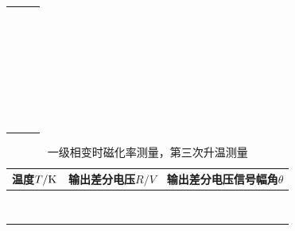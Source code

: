 \documentclass[11pt,a4paper]{ctexart}
\begin{document}
\begin{enumerate}
\begin{table}[H]
\begin{tabular}{|p{32mm}|p{32mm}|p{32mm}|}
  & & \\ \hline
  & & \\ \hline
   & & \\ \hline
    & & \\ \hline
 & & \\ \hline
  &  &\\ \hline
  &  &\\ \hline
  &  &\\ \hline
  &  &\\ \hline
  &  &\\ \hline
  &  &\\ \hline
  &  &\\ \hline
  &  &\\ \hline
  &  &\\ \hline
  &  &\\ \hline
  &  &\\ \hline
  &  &\\ \hline
    & &\\ \hline
  & &\\ \hline
   & &\\ \hline
     &  &\\ \hline
  &  &\\ \hline
  &  &\\ \hline
  &  &\\ \hline
  &  &\\ \hline
  &  &\\ \hline
  &  &\\ \hline
  &  &\\ \hline
    & &\\ \hline
  & &\\ \hline
   & &\\ \hline
  \end{tabular}
  \end{table}
      \begin{table}[H]
\centering
\caption{一级相变时磁化率测量，第三次升温测量\label{tablez6}}
\begin{tabular}{|p{32mm}|p{32mm}|p{32mm}|}
\hline
温度$T/{\rm K}$ & 输出差分电压$R/{V}$ & 输出差分电压信号幅角$\theta$ \\ \hline
 & & \\ \hline
  & & \\ \hline
  & & \\ \hline
   & & \\ \hline
    & & \\ \hline
 & & \\ \hline
  &  &\\ \hline
  &  &\\ \hline

\end{tabular}
\end{table}
\end{enumerate}
\end{document}
